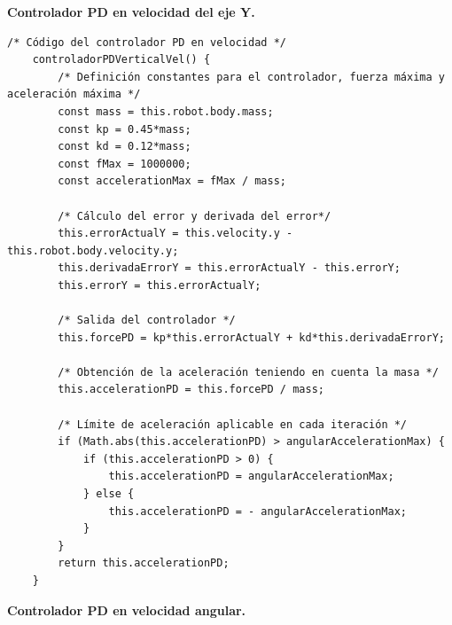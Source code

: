 \normalsize
\textbf{Controlador PD en velocidad del eje Y.}
\footnotesize {
\begin{verbatim}
/* Código del controlador PD en velocidad */
    controladorPDVerticalVel() {
        /* Definición constantes para el controlador, fuerza máxima y                   aceleración máxima */
        const mass = this.robot.body.mass;
        const kp = 0.45*mass;
        const kd = 0.12*mass;
        const fMax = 1000000;
        const accelerationMax = fMax / mass;

        /* Cálculo del error y derivada del error*/
        this.errorActualY = this.velocity.y - this.robot.body.velocity.y; 
        this.derivadaErrorY = this.errorActualY - this.errorY;
        this.errorY = this.errorActualY;
        
        /* Salida del controlador */
        this.forcePD = kp*this.errorActualY + kd*this.derivadaErrorY;
        
        /* Obtención de la aceleración teniendo en cuenta la masa */
        this.accelerationPD = this.forcePD / mass;

        /* Límite de aceleración aplicable en cada iteración */
        if (Math.abs(this.accelerationPD) > angularAccelerationMax) {
            if (this.accelerationPD > 0) {
                this.accelerationPD = angularAccelerationMax;
            } else {
                this.accelerationPD = - angularAccelerationMax;
            }
        }
        return this.accelerationPD;
    }
\end{verbatim}
}

\normalsize
\textbf{Controlador PD en velocidad angular.}


